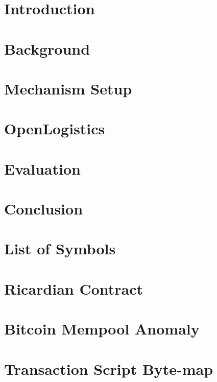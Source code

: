 \documentclass[Nomencl]{DylanMaster}
\begin{document}
\mytitlepage

\newpage

\tableofcontents

\newpage
\section{Introduction}


\newpage
\section{Background}


\newpage
\section{Mechanism Setup}


\newpage
\section{OpenLogistics}


\newpage
\section{Evaluation}


\newpage
\section{Conclusion}


\newpage
\appendix
\section{List of Symbols}


\newpage
\section{Ricardian Contract}


\newpage
\section{Bitcoin Mempool Anomaly}


\newpage
\section{Transaction Script Byte-map}


\newpage


\end{document}
